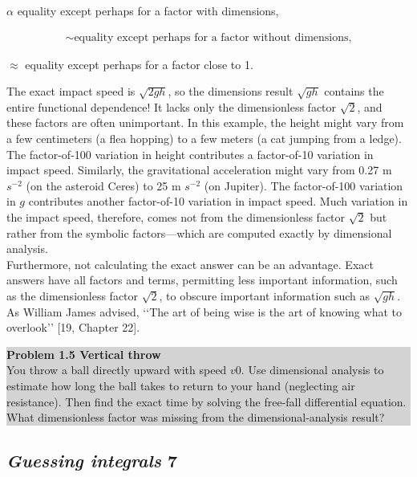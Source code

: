 \documentclass[a4paper]{article}
\numberwithin{equation}{section}
\begin{document}
\begin{center}
$\alpha$ \textrm{equality except perhaps for a factor with dimensions,}
\end{center}
\begin{eqnarray}
\sim \textrm{equality except perhaps for a factor without dimensions,}
\end{eqnarray}
\begin{center}
$\approx$ \textrm{equality except perhaps for a factor close to 1.}
\end{center}
The exact impact speed is $\sqrt{2gh}$, so the dimensions result $\sqrt{gh}$ contains
the entire functional dependence! It lacks only the dimensionless factor
$\sqrt{2}$, and these factors are often unimportant. In this example, the height
might vary from a few centimeters (a flea hopping) to a few meters (a cat
jumping from a ledge). The factor-of-100 variation in height contributes
a factor-of-10 variation in impact speed. Similarly, the gravitational acceleration
might vary from 0.27 m $s^{-2}$ (on the asteroid Ceres) to 25 m $s^{-2}$ (on
Jupiter). The factor-of-100 variation in $g$ contributes another factor-of-10
variation in impact speed. Much variation in the impact speed, therefore,
comes not from the dimensionless factor $\sqrt{2}$  but rather from the symbolic
factors—which are computed exactly by dimensional analysis.
\\

Furthermore, not calculating the exact answer can be an advantage. Exact
answers have all factors and terms, permitting less important information,
such as the dimensionless factor $\sqrt{2}$, to obscure important information
such as $\sqrt{gh}$. As William James advised, ‘‘The art of being wise is the art
of knowing what to overlook’’
[19, Chapter 22].
\\

\colorbox{lightgray}{
\begin{minipage}{\textwidth}
 {\normalsize\textbf{Problem 1.5 Vertical throw}
 \\
You throw a ball directly upward with speed $v0$. Use dimensional analysis to
estimate how long the ball takes to return to your hand (neglecting air resistance).
Then find the exact time by solving the free-fall differential equation. What
dimensionless factor was missing from the dimensional-analysis result?}
\end{minipage}
}

\newpage
\subsection{\textit{Guessing integrals} \hspace{8.8 cm} 7}
\end{document}
